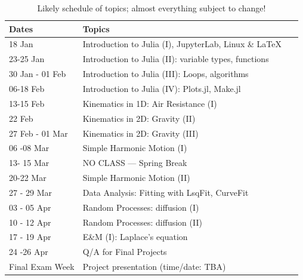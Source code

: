 \documentclass[justified]{tufte-handout}
\begin{document}
\begin{table}[h]
  \centering
  \selectfont
  \begin{tabular}{lll}  
    \toprule
    Dates &  Topics  \\
    \midrule
    18 Jan	         	& Introduction to Julia (I), JupyterLab, Linux \& \LaTeX\   \\
    23-25 Jan      	& Introduction to Julia (II): variable types, functions	\\    
   30 Jan - 01 Feb 	& Introduction to Julia (III): Loops, algorithms		 \\
    06-18 Feb      	& Introduction to Julia (IV): Plots.jl, Make.jl		\\
    13-15 Feb  		& Kinematics in 1D: Air Resistance (I)      			\\
    22 Feb		  	& Kinematics in 2D: Gravity (II)           			\\
   27 Feb - 01 Mar     	& Kinematics in 2D: Gravity (III)       				 \\
    06 -08 Mar      	& Simple Harmonic Motion (I)            			\\
    13- 15 Mar		& NO CLASS --- Spring Break 					\\
    20-22 Mar      	& Simple Harmonic Motion (II)           			\\
    27 - 29 Mar   	& Data Analysis: Fitting with LsqFit, CurveFit 		 \\
    03 - 05 Apr      	& Random Processes: diffusion (I)				\\
    10 - 12 Apr      	& Random Processes: diffusion	 (II)				\\
    17 - 19 Apr      	& E\&M (I): Laplace's equation					\\
    24 -26 Apr      	&Q/A for Final Projects	 					\\
    Final Exam Week  & Project presentation (time/date: TBA)			\\
  \bottomrule
  \end{tabular}
  \caption{Likely schedule of topics; almost everything subject  to change!}
  \label{tab:normaltab}
\end{table}
\end{document}
